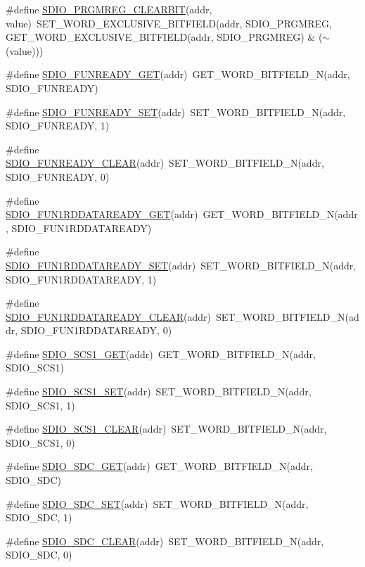 \begin{DoxyCompactItemize}
\item 
\#define \hyperlink{a00570_ab8ac04755aa864fda128e2bde5504d4e}{SDIO\_\-PRGMREG\_\-CLEARBIT}(addr, value)~SET\_\-WORD\_\-EXCLUSIVE\_\-BITFIELD(addr, SDIO\_\-PRGMREG, GET\_\-WORD\_\-EXCLUSIVE\_\-BITFIELD(addr, SDIO\_\-PRGMREG) \& ($\sim$(value)))
\item 
\#define \hyperlink{a00570_aa58cfa6e924501afb76ff5533bc4b089}{SDIO\_\-FUNREADY\_\-GET}(addr)~GET\_\-WORD\_\-BITFIELD\_\-N(addr, SDIO\_\-FUNREADY)
\item 
\#define \hyperlink{a00570_ab4e2d2ecac165f77be6aeee7f208fb53}{SDIO\_\-FUNREADY\_\-SET}(addr)~SET\_\-WORD\_\-BITFIELD\_\-N(addr, SDIO\_\-FUNREADY, 1)
\item 
\#define \hyperlink{a00570_a12d6276db92cbfedaf612790154d9d12}{SDIO\_\-FUNREADY\_\-CLEAR}(addr)~SET\_\-WORD\_\-BITFIELD\_\-N(addr, SDIO\_\-FUNREADY, 0)
\item 
\#define \hyperlink{a00570_a1026c0d36790e10eafb7ae9657c855e2}{SDIO\_\-FUN1RDDATAREADY\_\-GET}(addr)~GET\_\-WORD\_\-BITFIELD\_\-N(addr, SDIO\_\-FUN1RDDATAREADY)
\item 
\#define \hyperlink{a00570_a6b4bb4541e42a03f7468c80c6704305e}{SDIO\_\-FUN1RDDATAREADY\_\-SET}(addr)~SET\_\-WORD\_\-BITFIELD\_\-N(addr, SDIO\_\-FUN1RDDATAREADY, 1)
\item 
\#define \hyperlink{a00570_a8ae3103c43586244a30e0b23701c6750}{SDIO\_\-FUN1RDDATAREADY\_\-CLEAR}(addr)~SET\_\-WORD\_\-BITFIELD\_\-N(addr, SDIO\_\-FUN1RDDATAREADY, 0)
\item 
\#define \hyperlink{a00570_a8cb1c60db0be24c99d39bfe8b1bb1f87}{SDIO\_\-SCS1\_\-GET}(addr)~GET\_\-WORD\_\-BITFIELD\_\-N(addr, SDIO\_\-SCS1)
\item 
\#define \hyperlink{a00570_a642b439f9118fad23b5c61dbbd45ac77}{SDIO\_\-SCS1\_\-SET}(addr)~SET\_\-WORD\_\-BITFIELD\_\-N(addr, SDIO\_\-SCS1, 1)
\item 
\#define \hyperlink{a00570_ad23580810f3d380982b07a4f52775b31}{SDIO\_\-SCS1\_\-CLEAR}(addr)~SET\_\-WORD\_\-BITFIELD\_\-N(addr, SDIO\_\-SCS1, 0)
\item 
\#define \hyperlink{a00570_a090c300bbe0221653c83b6735b319282}{SDIO\_\-SDC\_\-GET}(addr)~GET\_\-WORD\_\-BITFIELD\_\-N(addr, SDIO\_\-SDC)
\item 
\#define \hyperlink{a00570_aa6d202e168b767603231026f9e2fa19e}{SDIO\_\-SDC\_\-SET}(addr)~SET\_\-WORD\_\-BITFIELD\_\-N(addr, SDIO\_\-SDC, 1)
\item 
\#define \hyperlink{a00570_a13f478bd5decc7081a54a07245e09d2e}{SDIO\_\-SDC\_\-CLEAR}(addr)~SET\_\-WORD\_\-BITFIELD\_\-N(addr, SDIO\_\-SDC, 0)

\end{DoxyCompactItemize}
